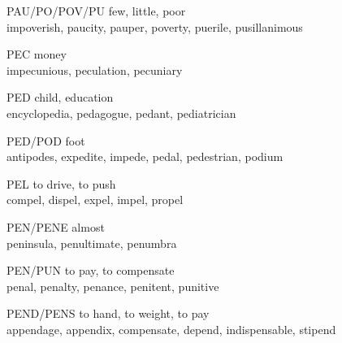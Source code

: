 \begin{flashcard}[Roots]{PAU/PO/POV/PU}
few, little, poor\\
\vspace{0.2in}
impoverish, paucity, pauper, poverty, puerile, pusillanimous\\
\end{flashcard}

\begin{flashcard}[Roots]{PEC}
money\\
\vspace{0.2in}
impecunious, peculation, pecuniary\\
\end{flashcard}

\begin{flashcard}[Roots]{PED}
child, education\\
\vspace{0.2in}
encyclopedia, pedagogue, pedant, pediatrician\\
\end{flashcard}

\begin{flashcard}[Roots]{PED/POD}
foot\\
\vspace{0.2in}
antipodes, expedite, impede, pedal, pedestrian, podium\\
\end{flashcard}

\begin{flashcard}[Roots]{PEL}
to drive, to push\\
\vspace{0.2in}
compel, dispel, expel, impel, propel\\
\end{flashcard}

\begin{flashcard}[Roots]{PEN/PENE}
almost\\
\vspace{0.2in}
peninsula, penultimate, penumbra\\
\end{flashcard}

\begin{flashcard}[Roots]{PEN/PUN}
to pay, to compensate\\
\vspace{0.2in}
penal, penalty, penance, penitent, punitive\\
\end{flashcard}

\begin{flashcard}[Roots]{PEND/PENS}
to hand, to weight, to pay\\
\vspace{0.2in}
appendage, appendix, compensate, depend, indispensable, stipend\\
\end{flashcard}

